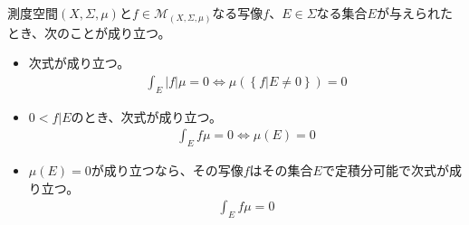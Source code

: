 \documentclass[dvipdfmx]{jsarticle}
\begin{document}
\begin{thm}\label{4.6.1.20}
測度空間$(X,\varSigma,\mu)$と$f \in \mathcal{M}_{(X,\varSigma,\mu)}$なる写像$f$、$E \in \varSigma$なる集合$E$が与えられたとき、次のことが成り立つ。
\begin{itemize}
\item
  次式が成り立つ。
\begin{align*}
\int_{E} {|f|\mu} = 0 \Leftrightarrow \mu\left( \left\{ f|E \neq 0 \right\} \right) = 0
\end{align*}
\item
  $0 < f|E$のとき、次式が成り立つ。
\begin{align*}
\int_{E} {f\mu} = 0 \Leftrightarrow \mu(E) = 0
\end{align*}
\item
  $\mu(E) = 0$が成り立つなら、その写像$f$はその集合$E$で定積分可能で次式が成り立つ。
\begin{align*}
\int_{E} {f\mu} = 0
\end{align*}
\end{itemize}
\end{thm}
\end{document}
